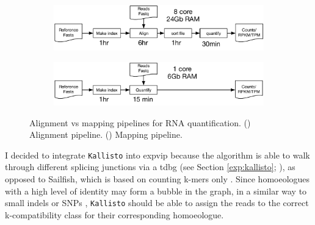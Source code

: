 \begin{figure}
\begin{subfigure}{1\textwidth}
\caption{}
\label{fig:exp:alnPipeline}
\includegraphics[width=1\textwidth]{expVIP/Figures/alnpipeline.pdf}
\end{subfigure}

\begin{subfigure}{1\textwidth}
\caption{}
\label{fig:exp:mapPipeline}
\includegraphics[width=1\textwidth]{expVIP/Figures/mappipeline.pdf}
\end{subfigure}

\caption[Alignment vs mapping pipelines]{Alignment vs mapping pipelines for RNA quantification. () Alignment pipeline. () Mapping pipeline.}
\label{fig:exp:alnVSmap}
\end{figure} 

I decided to integrate \verb|Kallisto|  into \gls{expvip} because the algorithm is able to walk through different splicing junctions via a \gls{tdbg} (see Section \ref{exp:kallisto}; \citealt{Bray2016}), as opposed to Sailfish, which is based on counting k-mers only \citep{Patro2014}. 
Since homoeologues with a high level of identity may form a bubble in the graph, in a similar way to small indels or SNPs \citep{Leggett2013}, \verb|Kallisto|  should be able to assign the reads to the correct k-compatibility class for their corresponding homoeologue.  

